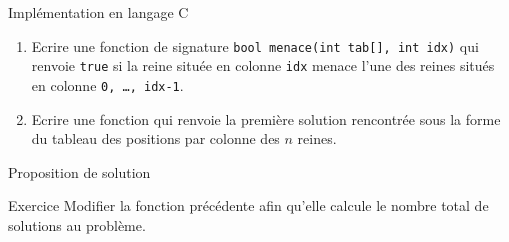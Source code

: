\documentclass[10pt]{beamer}
\begin{document}
\begin{frame}[fragile]{\Ctitle}{\stitle}
    \begin{exampleblock}{Implémentation en langage C}
        \begin{enumerate}
            \item Ecrire une fonction de signature \texttt{bool menace(int tab[], int idx)} qui renvoie \texttt{true} si la reine située en colonne {\tt idx} menace l'une des reines situés en colonne {\tt 0, \dots, idx-1}.\\
            \item Ecrire une fonction qui renvoie la première solution rencontrée sous la forme du tableau des positions par colonne des $n$ reines.
        \end{enumerate}
    \end{exampleblock}
\end{frame}


\begin{frame}[fragile]{\Ctitle}{\stitle}
    \begin{exampleblock}{Proposition de solution}
    \end{exampleblock}
\end{frame}

\begin{frame}[fragile]{\Ctitle}{\stitle}
    \begin{exampleblock}{Exercice}
            Modifier la fonction précédente afin qu'elle calcule le nombre total de solutions au problème.
    \end{exampleblock}
\end{frame}
\end{document}
